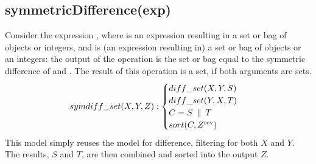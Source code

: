 \subsection{symmetricDifference(exp)}
Consider the expression , where  is an expression resulting in a set or bag of objects or integers, and  is (an expression resulting in) a set or bag of objects or an integers: the output of the operation is the set or bag equal to the symmetric difference of  and .
The result of this operation is a set, if both arguments are sets.
\begin{equation}\label{csp:symdiff_set}
    symdiff\_set(X,Y,Z):
    \begin{cases}
        diff\_set(X,Y,S)\\
        diff\_set(Y,X,T)\\
        C = S \;\mathbin{\|}\; T\\
        sort(C,Z^{\text{rev}})
    \end{cases}
\end{equation}
This model simply reuses the model for difference, filtering for both $X$ and $Y$.
The results, $S$ and $T$, are then combined and sorted into the output $Z$.



